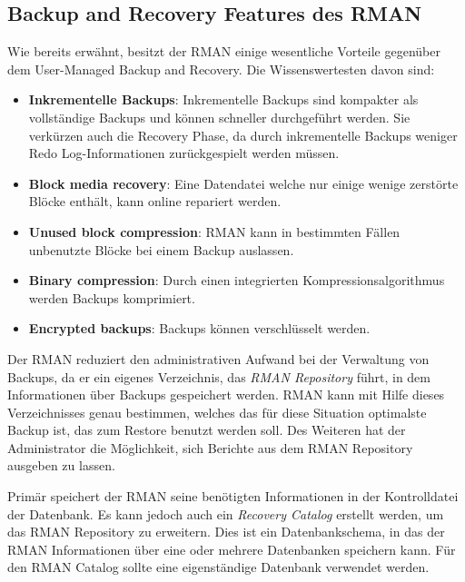       \subsection{Backup and Recovery Features des RMAN}
        Wie bereits erwähnt, besitzt der RMAN einige wesentliche Vorteile gegenüber dem User-Managed Backup and Recovery. Die Wissenswertesten davon sind:
        \begin{itemize}
          \item \textbf{Inkrementelle Backups}: Inkrementelle Backups sind kompakter als vollständige Backups und können schneller durchgeführt werden. Sie verkürzen auch die Recovery Phase, da durch inkrementelle Backups weniger Redo Log-Informationen zurückgespielt werden müssen.
          \item \textbf{Block media recovery}: Eine Datendatei welche nur einige wenige zerstörte Blöcke enthält, kann online repariert werden.
          \item \textbf{Unused block compression}: RMAN kann in bestimmten Fällen unbenutzte Blöcke bei einem Backup auslassen.
          \item \textbf{Binary compression}: Durch einen integrierten Kompressionsalgorithmus werden Backups komprimiert.
          \item \textbf{Encrypted backups}: Backups können verschlüsselt werden.
        \end{itemize}
\clearpage
        Der RMAN reduziert den administrativen Aufwand bei der Verwaltung von
        Backups, da er ein eigenes Verzeichnis, das \textit{RMAN Repository}
        führt, in dem  Informationen über Backups gespeichert werden. RMAN
        kann mit Hilfe dieses Verzeichnisses genau bestimmen, welches das für
        diese Situation optimalste Backup ist, das zum Restore benutzt werden
        soll. Des Weiteren hat der Administrator die Möglichkeit, sich
        Berichte aus dem RMAN Repository ausgeben zu lassen.

        Primär speichert der RMAN seine benötigten Informationen in der Kontrolldatei der Datenbank. Es kann jedoch auch ein \textit{Recovery Catalog} erstellt werden, um das RMAN Repository zu erweitern. Dies ist ein Datenbankschema, in das der RMAN Informationen über eine oder mehrere Datenbanken speichern kann. Für den RMAN Catalog sollte eine eigenständige Datenbank verwendet werden.
